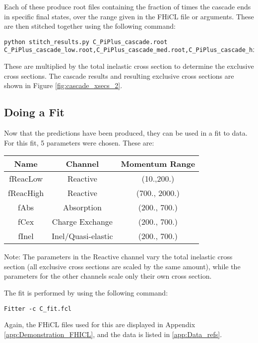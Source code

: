 \documentclass[12pt]{article}
\begin{document}
Each of these produce root files containing the fraction of times the cascade ends in specific final states, over the range given in the FHiCL file or arguments. These are then stitched together using the following command:

\begin{lstlisting}
python stitch_results.py C_PiPlus_cascade.root C_PiPlus_cascade_low.root,C_PiPlus_cascade_med.root,C_PiPlus_cascade_high.root
\end{lstlisting}

These are multiplied by the total inelastic cross section to determine the exclusive cross sections. The cascade results and resulting exclusive cross 
sections are shown in Figure \ref{fig:cascade_xsecs_2}.

\subsection{Doing a Fit}\label{ssec:Fit}
Now that the predictions have been produced, they can be used in a fit to data. For this fit, 5 parameters were chosen. These are:

\begin{center}\label{ref:parameters}
  \begin{tabular}{| c | c | c |}
  \hline
  \textbf{Name} & \textbf{Channel} & \textbf{Momentum Range}  \\
  \hline
  \hline
  fReacLow & Reactive & (10.,200.) \\ 
  \hline
  fReacHigh & Reactive & (700., 2000.) \\
  \hline	
  fAbs & Absorption & (200., 700.) \\
  \hline  
  fCex & Charge Exchange & (200., 700.) \\
  \hline
  fInel & Inel/Quasi-elastic & (200., 700.) \\
  \hline
  \end{tabular}
\end{center}
Note: The parameters in the Reactive channel vary the total inelastic cross section (all exclusive cross sections are scaled by the same amount), while the parameters for the other channels scale only their own cross section.

The fit is performed by using the following command:
\begin{lstlisting}
Fitter -c C_fit.fcl
\end{lstlisting}
Again, the FHiCL files used for this are displayed in Appendix \ref{app:Demonstration_FHICL}, and the data is listed in \ref{app:Data_refs}.
\end{document}
